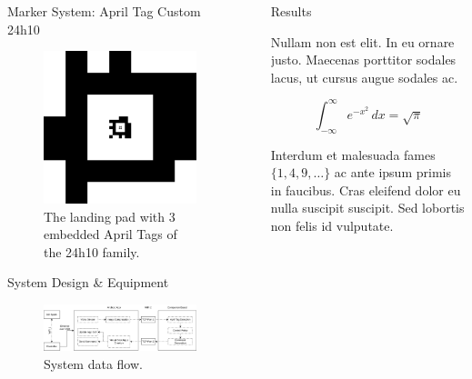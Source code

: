 \documentclass[final, 20pt]{beamer}
\newlength{\sepwidth}
\newlength{\colwidth}
\newcommand{\separatorcolumn}{\begin{column}{\sepwidth}\end{column}}
\begin{document}
\begin{frame}[t]
\begin{columns}[t]
\begin{column}{\colwidth}
\begin{block}{Marker System: April Tag Custom 24h10}
    \begin{figure}
      \centering
      \includegraphics[width=5cm]{images/tagCustom24h10_00002_00001_00000}
      \caption{The landing pad with 3 embedded April Tags of the 24h10 family.}
    \end{figure}

  \end{block}

  \begin{alertblock}{System Design \& Equipment}

    \begin{figure}
      \centering
      \includegraphics[width=\linewidth]{images/spark_architecture.drawio.png}
      \caption{System data flow.}
    \end{figure}

  \end{alertblock}

\end{column}

\separatorcolumn

\begin{column}{\colwidth}

  \begin{alertblock}{Results}

    Nullam non est elit. In eu ornare justo. Maecenas porttitor sodales lacus,
    ut cursus augue sodales ac.

    $$
    \int_{-\infty}^{\infty} e^{-x^2}\,dx = \sqrt{\pi}
    $$

    Interdum et malesuada fames $\{1, 4, 9, \ldots\}$ ac ante ipsum primis in
    faucibus. Cras eleifend dolor eu nulla suscipit suscipit. Sed lobortis non
    felis id vulputate.


\end{alertblock}
\end{column}
\end{columns}
\end{frame}
\end{document}
